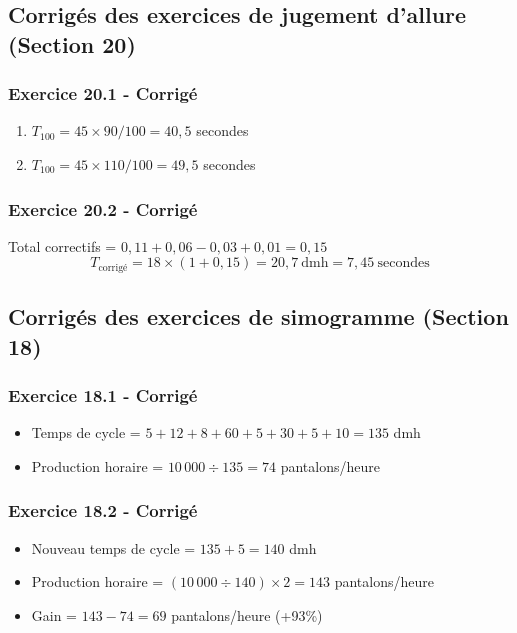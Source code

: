 \documentclass[a4paper,12pt]{article}
\begin{document}
\subsection{Corrigés des exercices de jugement d'allure (Section 20)}

\subsubsection{Exercice 20.1 - Corrigé}

\begin{enumerate}
    \item $T_{100} = 45 \times 90/100 = 40,5$ secondes
    \item $T_{100} = 45 \times 110/100 = 49,5$ secondes
\end{enumerate}

\subsubsection{Exercice 20.2 - Corrigé}

Total correctifs = $0,11 + 0,06 - 0,03 + 0,01 = 0,15$
\[
T_{\text{corrigé}} = 18 \times (1 + 0,15) = 20,7\ \text{dmh} = 7,45\ \text{secondes}
\]

\subsection{Corrigés des exercices de simogramme (Section 18)}

\subsubsection{Exercice 18.1 - Corrigé}

\begin{itemize}
    \item Temps de cycle = $5+12+8+60+5+30+5+10 = 135$ dmh
    \item Production horaire = $10\,000 \div 135 = 74$ pantalons/heure
\end{itemize}

\subsubsection{Exercice 18.2 - Corrigé}

\begin{itemize}
    \item Nouveau temps de cycle = $135 + 5 = 140$ dmh
    \item Production horaire = $(10\,000 \div 140) \times 2 = 143$ pantalons/heure
    \item Gain = $143 - 74 = 69$ pantalons/heure (+93\%)
\end{itemize}
\end{document}
